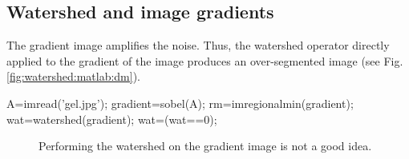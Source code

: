 \subsection{Watershed and image gradients}
The gradient image amplifies the noise. Thus, the watershed operator directly applied to the gradient of the image produces an over-segmented image (see Fig.\ref{fig:watershed:matlab:dm}).

\begin{matlab}
A=imread('gel.jpg');
gradient=sobel(A);
rm=imregionalmin(gradient);
wat=watershed(gradient);
wat=(wat==0);
\end{matlab}

\begin{figure}[htbp]
 \centering
 \hfill
 \hfill
 \caption{Performing the watershed on the gradient image is not a good idea.}
 \label{fig:watershed:matlab:wat}
\end{figure}

